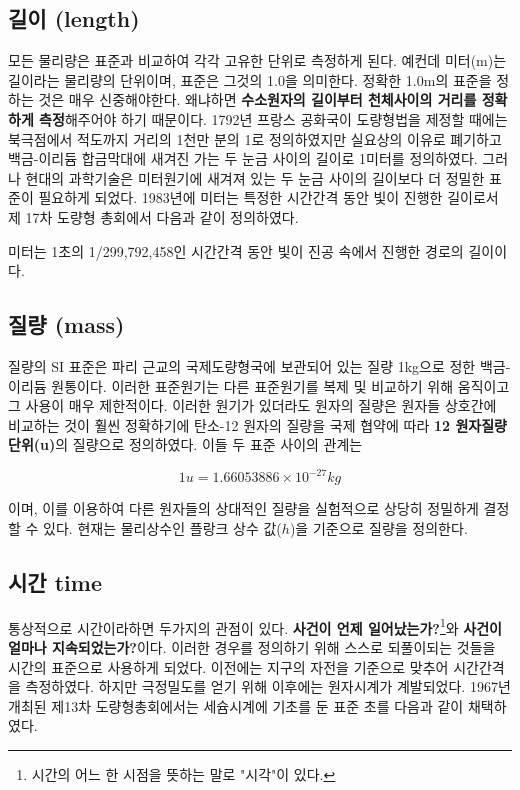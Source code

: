 \documentclass[article,chapter,openany,amsmath,gremph,lwarp]{oblivoir}
\begin{document}
\begin{flushleft}
\subsection{길이 (length)}
모든 물리량은 표준과 비교하여 각각 고유한 단위로 측정하게 된다. 예컨데 미터(m)는 길이라는 물리량의 단위이며, 표준은 그것의 1.0을 의미한다. 
정확한 1.0m의 표준을 정하는 것은 매우 신중해야한다. 왜냐하면 \textbf{수소원자의 길이부터 천체사이의 거리를 정확하게 측정}해주어야 하기 때문이다. 
1792년 프랑스 공화국이 도량형법을 제정할 때에는 북극점에서 적도까지 거리의 1천만 분의 1로 정의하였지만 실요상의 이유로 폐기하고 백금-이리듐 합금막대에
새겨진 가는 두 눈금 사이의 길이로 1미터를 정의하였다. 그러나 현대의 과학기술은 미터원기에 새겨져 있는 두 눈금 사이의 길이보다 
더 정밀한 표준이 필요하게 되었다. 1983년에 미터는 특정한 시간간격 동안 빛이 진행한 길이로서 제 17차 도량형 총회에서 다음과 같이 정의하였다. 



  \begin{defn}[ 1m ]
    미터는 1초의 1/299,792,458인 시간간격 동안 빛이 진공 속에서 진행한 경로의 길이이다. 
  \end{defn}



\subsection{질량 (mass)}
질량의 SI 표준은 파리 근교의 국제도량형국에 보관되어 있는 질량 1kg으로 정한 백금-이리듐 원통이다. 이러한 표준원기는 다른 표준원기를
복제 및 비교하기 위해 움직이고 그 사용이 매우 제한적이다. 이러한 원기가 있더라도 원자의 질량은 원자들 상호간에 비교하는 것이 훨씬 정확하기에 
탄소-12 원자의 질량을 국제 협약에 따라 \textbf{12 원자질량단위(u)}의 질량으로 정의하였다. 이들 두 표준 사이의 관계는 


  \begin{equation}
    1u=1.66053886\times 10^{-27}kg
  \end{equation}

이며, 이를 이용하여 다른 원자들의 상대적인 질량을 실험적으로 상당히 정밀하게 결정할 수 있다. 현재는 물리상수인 플랑크 상수 값($h$)을 기준으로 
질량을 정의한다. 


\subsection{시간 time}
통상적으로 시간이라하면 두가지의 관점이 있다. \textbf{사건이 언제 일어났는가?}\footnote[1]{시간의 어느 한 시점을 뜻하는 말로 "시각"이 있다.}와\textbf{ 사건이 얼마나 지속되었는가?}이다. 
이러한 경우를 정의하기 위해 스스로 되풀이되는 것들을 시간의 표준으로 사용하게 되었다. 이전에는 지구의 자전을 기준으로 맞추어 시간간격을 
측정하였다. 하지만 극정밀도를 얻기 위해 이후에는 원자시계가 계발되었다. 1967년 개최된 제13차 도량형총회에서는 세슘시계에 기초를 둔 표준 
초를 다음과 같이 채택하였다.


\end{flushleft}
\end{document}
